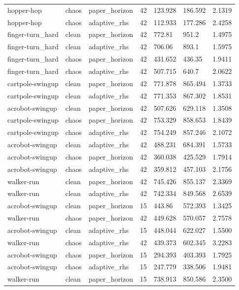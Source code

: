 \begin{tabular}{lllllll}
hopper-hop & chaos & paper\_horizon & 42 & 123.928 & 186.592 & 2.1319 \\
hopper-hop & chaos & adaptive\_rhs & 42 & 112.933 & 177.286 & 2.4258 \\
finger-turn\_hard & clean & paper\_horizon & 42 & 772.81 & 951.2 & 1.4975 \\
finger-turn\_hard & clean & adaptive\_rhs & 42 & 706.06 & 893.1 & 1.5975 \\
finger-turn\_hard & chaos & paper\_horizon & 42 & 431.652 & 436.35 & 1.9411 \\
finger-turn\_hard & chaos & adaptive\_rhs & 42 & 507.715 & 640.7 & 2.0622 \\
cartpole-swingup & clean & paper\_horizon & 42 & 771.878 & 865.494 & 1.3733 \\
cartpole-swingup & clean & adaptive\_rhs & 42 & 771.353 & 867.302 & 1.8531 \\
acrobot-swingup & clean & paper\_horizon & 42 & 507.626 & 629.118 & 1.3508 \\
cartpole-swingup & chaos & paper\_horizon & 42 & 753.329 & 858.653 & 1.8439 \\
cartpole-swingup & chaos & adaptive\_rhs & 42 & 754.249 & 857.246 & 2.1072 \\
acrobot-swingup & clean & adaptive\_rhs & 42 & 488.231 & 684.391 & 1.5733 \\
acrobot-swingup & chaos & paper\_horizon & 42 & 360.038 & 425.529 & 1.7914 \\
acrobot-swingup & chaos & adaptive\_rhs & 42 & 359.812 & 457.103 & 2.1756 \\
walker-run & clean & paper\_horizon & 42 & 745.426 & 855.137 & 2.3369 \\
walker-run & clean & adaptive\_rhs & 42 & 742.334 & 849.568 & 2.6539 \\
acrobot-swingup & clean & paper\_horizon & 15 & 443.86 & 572.393 & 1.3425 \\
walker-run & chaos & paper\_horizon & 42 & 449.628 & 570.057 & 2.7578 \\
acrobot-swingup & clean & adaptive\_rhs & 15 & 448.044 & 622.027 & 1.5500 \\
walker-run & chaos & adaptive\_rhs & 42 & 439.373 & 602.345 & 3.2283 \\
acrobot-swingup & chaos & paper\_horizon & 15 & 294.393 & 403.393 & 1.7925 \\
acrobot-swingup & chaos & adaptive\_rhs & 15 & 247.779 & 338.506 & 1.9481 \\
walker-run & clean & paper\_horizon & 15 & 738.913 & 850.586 & 2.3500 \\

\end{tabular}
